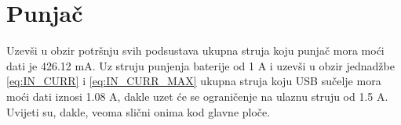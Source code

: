 \section{Punjač}

Uzevši u obzir potršnju svih podsustava ukupna struja koju punjač mora moći dati je 426.12 mA. Uz struju punjenja baterije od 1 A i uzevši u obzir jednadžbe \ref{eq:IN_CURR} i \ref{eq:IN_CURR_MAX} ukupna struja koju USB sučelje mora moći dati iznosi 1.08 A, dakle uzet će se ograničenje na ulaznu struju od 1.5 A. Uvijeti su, dakle, veoma slični onima kod glavne ploče.